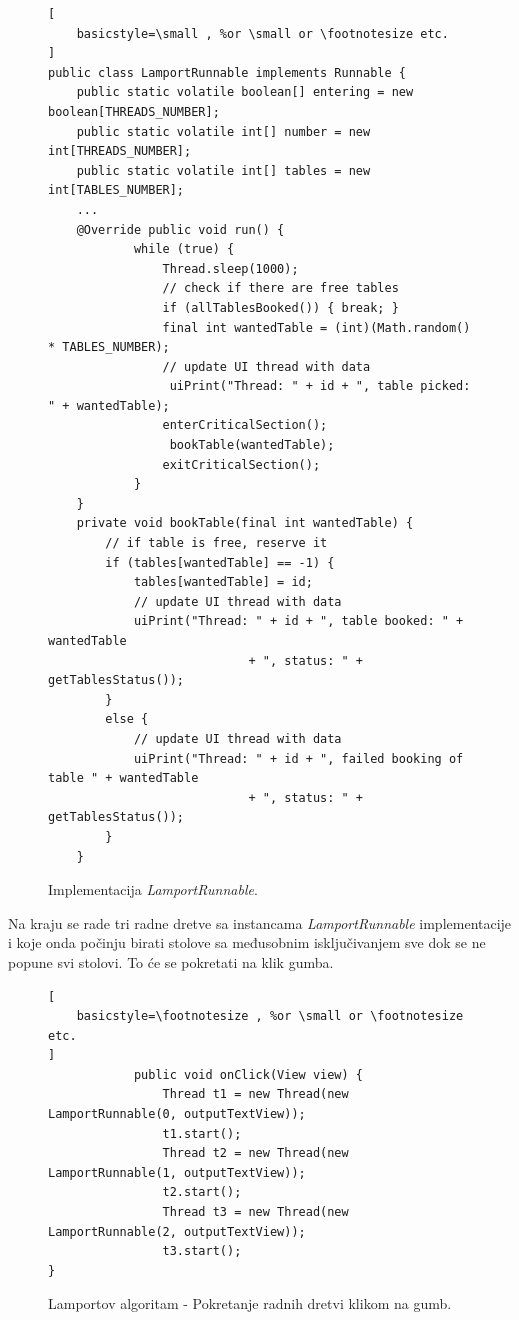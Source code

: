 \documentclass[times, utf8, zavrsni]{fer}
\begin{document}
\begin{figure}[ht!]
\begin{lstlisting}[
    basicstyle=\small , %or \small or \footnotesize etc.
]
public class LamportRunnable implements Runnable {
    public static volatile boolean[] entering = new boolean[THREADS_NUMBER];
    public static volatile int[] number = new int[THREADS_NUMBER];
    public static volatile int[] tables = new int[TABLES_NUMBER];
	...
    @Override public void run() {
            while (true) {
                Thread.sleep(1000);
                // check if there are free tables
                if (allTablesBooked()) { break; }
                final int wantedTable = (int)(Math.random() * TABLES_NUMBER);
                // update UI thread with data
                 uiPrint("Thread: " + id + ", table picked: " + wantedTable);                
                enterCriticalSection();
                 bookTable(wantedTable);
                exitCriticalSection();
            }
    }
    private void bookTable(final int wantedTable) {
        // if table is free, reserve it
        if (tables[wantedTable] == -1) {
            tables[wantedTable] = id;
            // update UI thread with data
            uiPrint("Thread: " + id + ", table booked: " + wantedTable
                            + ", status: " + getTablesStatus());
        }
        else {
            // update UI thread with data
            uiPrint("Thread: " + id + ", failed booking of table " + wantedTable
                            + ", status: " + getTablesStatus());
        }
	}
\end{lstlisting}
\caption{Implementacija \textit{LamportRunnable}.}
\label{overflow}
\end{figure}
\newpage

Na kraju se rade tri radne dretve sa instancama \textit{LamportRunnable} implementacije i koje onda počinju birati stolove sa međusobnim isključivanjem sve dok se ne popune svi stolovi. To će se pokretati na klik gumba.

\begin{figure}[ht!]
\begin{lstlisting}[
    basicstyle=\footnotesize , %or \small or \footnotesize etc.
]
			public void onClick(View view) {
                Thread t1 = new Thread(new LamportRunnable(0, outputTextView));
                t1.start();
                Thread t2 = new Thread(new LamportRunnable(1, outputTextView));
                t2.start();
                Thread t3 = new Thread(new LamportRunnable(2, outputTextView));
                t3.start();
}
\end{lstlisting}
\caption{Lamportov algoritam - Pokretanje radnih dretvi klikom na gumb.}
\label{overflow}
\end{figure}
\end{document}

